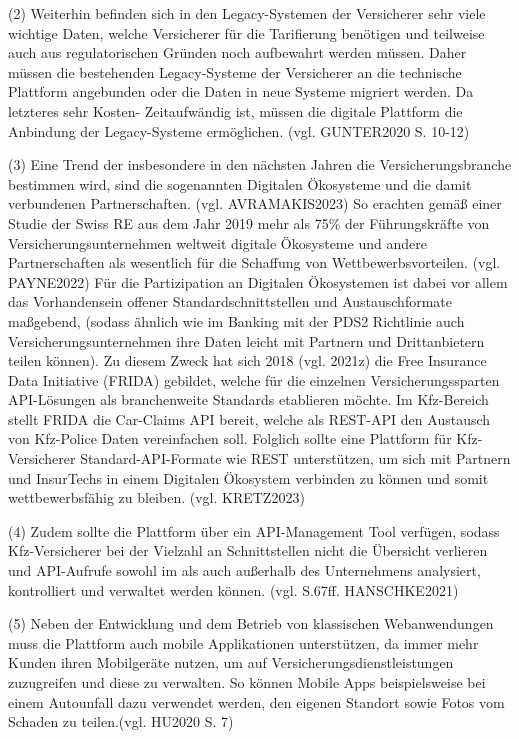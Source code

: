 (2) Weiterhin befinden sich in den Legacy-Systemen der Versicherer sehr viele wichtige Daten, welche Versicherer für die Tarifierung benötigen und teilweise auch aus regulatorischen Gründen noch aufbewahrt werden müssen. Daher müssen die bestehenden Legacy-Systeme der Versicherer an die technische Plattform angebunden oder die Daten in neue Systeme migriert werden. Da letzteres sehr Kosten- Zeitaufwändig ist, müssen die digitale Plattform die Anbindung der Legacy-Systeme ermöglichen.  (vgl. GUNTER2020 S. 10-12)

(3) Eine Trend der insbesondere in den nächsten Jahren die Versicherungsbranche bestimmen wird, sind die sogenannten Digitalen Ökosysteme und die damit verbundenen Partnerschaften. (vgl. AVRAMAKIS2023)  So erachten gemäß einer Studie der Swiss RE aus dem Jahr 2019 mehr als 75\% der Führungskräfte von Versicherungsunternehmen weltweit digitale Ökosysteme und andere Partnerschaften als wesentlich für die Schaffung von Wettbewerbsvorteilen. (vgl. PAYNE2022) Für die Partizipation an Digitalen Ökosystemen ist dabei vor allem das Vorhandensein offener Standardschnittstellen und Austauschformate maßgebend, (sodass ähnlich wie im Banking mit der PDS2 Richtlinie auch Versicherungsunternehmen ihre Daten leicht mit Partnern und Drittanbietern teilen können). Zu diesem Zweck hat sich 2018 (vgl. 2021z) die Free Insurance Data Initiative (FRIDA) gebildet, welche für die einzelnen Versicherungssparten API-Lösungen als branchenweite Standards etablieren möchte. Im Kfz-Bereich stellt FRIDA die Car-Claims API bereit, welche als REST-API den Austausch von Kfz-Police Daten vereinfachen soll. Folglich sollte eine Plattform für Kfz-Versicherer Standard-API-Formate wie REST unterstützen, um sich mit Partnern und InsurTechs in einem Digitalen Ökosystem verbinden zu können und somit wettbewerbsfähig zu bleiben. (vgl. KRETZ2023) 

(4) Zudem sollte die Plattform über ein API-Management Tool verfügen, sodass Kfz-Versicherer bei der Vielzahl an Schnittstellen nicht die Übersicht verlieren und API-Aufrufe sowohl im als auch außerhalb des Unternehmens analysiert, kontrolliert und verwaltet werden können. (vgl. S.67ff. HANSCHKE2021) 

(5) Neben der Entwicklung und dem Betrieb von klassischen Webanwendungen muss die Plattform auch mobile Applikationen unterstützen, da immer mehr Kunden ihren Mobilgeräte nutzen, um auf Versicherungsdienstleistungen zuzugreifen und diese zu verwalten. So können Mobile Apps beispielsweise bei einem Autounfall dazu verwendet werden, den eigenen Standort sowie Fotos vom Schaden zu teilen.(vgl. HU2020 S. 7)

